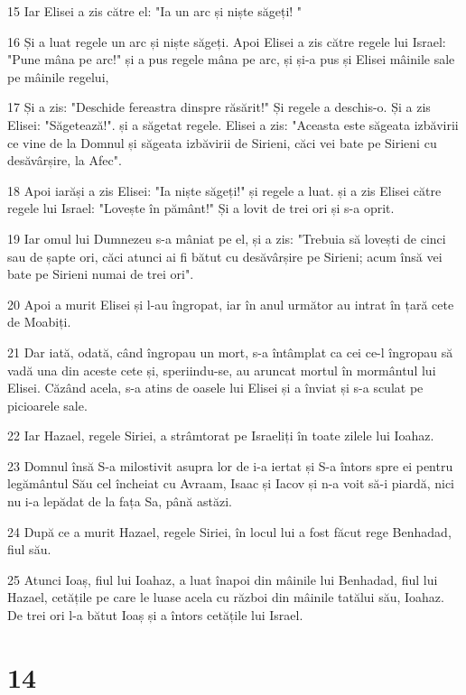 \par 15 Iar Elisei a zis către el: "Ia un arc și niște săgeți! "
\par 16 Și a luat regele un arc și niște săgeți. Apoi Elisei a zis către regele lui Israel: "Pune mâna pe arc!" și a pus regele mâna pe arc, și și-a pus și Elisei mâinile sale pe mâinile regelui,
\par 17 Și a zis: "Deschide fereastra dinspre răsărit!" Și regele a deschis-o. Și a zis Elisei: "Săgetează!". și a săgetat regele. Elisei a zis: "Aceasta este săgeata izbăvirii ce vine de la Domnul și săgeata izbăvirii de Sirieni, căci vei bate pe Sirieni cu desăvârșire, la Afec".
\par 18 Apoi iarăși a zis Elisei: "Ia niște săgeți!" și regele a luat. și a zis Elisei către regele lui Israel: "Lovește în pământ!" Și a lovit de trei ori și s-a oprit.
\par 19 Iar omul lui Dumnezeu s-a mâniat pe el, și a zis: "Trebuia să lovești de cinci sau de șapte ori, căci atunci ai fi bătut cu desăvârșire pe Sirieni; acum însă vei bate pe Sirieni numai de trei ori".
\par 20 Apoi a murit Elisei și l-au îngropat, iar în anul următor au intrat în țară cete de Moabiți.
\par 21 Dar iată, odată, când îngropau un mort, s-a întâmplat ca cei ce-l îngropau să vadă una din aceste cete și, speriindu-se, au aruncat mortul în mormântul lui Elisei. Căzând acela, s-a atins de oasele lui Elisei și a înviat și s-a sculat pe picioarele sale.
\par 22 Iar Hazael, regele Siriei, a strâmtorat pe Israeliți în toate zilele lui Ioahaz.
\par 23 Domnul însă S-a milostivit asupra lor de i-a iertat și S-a întors spre ei pentru legământul Său cel încheiat cu Avraam, Isaac și Iacov și n-a voit să-i piardă, nici nu i-a lepădat de la fața Sa, până astăzi.
\par 24 După ce a murit Hazael, regele Siriei, în locul lui a fost făcut rege Benhadad, fiul său.
\par 25 Atunci Ioaș, fiul lui Ioahaz, a luat înapoi din mâinile lui Benhadad, fiul lui Hazael, cetățile pe care le luase acela cu război din mâinile tatălui său, Ioahaz. De trei ori l-a bătut Ioaș și a întors cetățile lui Israel.

\chapter{14}


